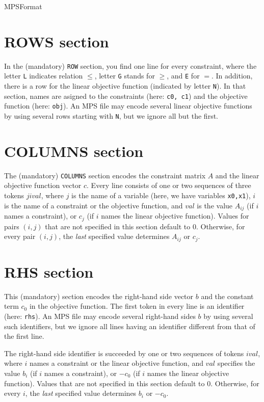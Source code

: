 \begin{ccRefConcept}{MPSFormat}
\section*{ROWS section}
In the (mandatory) \texttt{ROW} section, you find one line for every
constraint, where the letter \texttt{L} indicates relation $\leq$,
letter \texttt{G} stands for $\geq$, and \texttt{E} for $=$. In
addition, there is a row for the linear objective function (indicated
by letter \texttt{N}). In that section, names are asigned to the
constraints (here: \texttt{c0, c1}) and the objective function (here:
\texttt{obj}).  An MPS file may encode several linear objective
functions by using several rows starting with \texttt{N}, but we ignore
all but the first.

\section*{COLUMNS section}
The (mandatory) \texttt{COLUMNS} section encodes the constraint matrix
$A$ and the linear objective function vector $c$. Every line consists
of one or two sequences of three tokens $j i val$, where $j$ is the
name of a variable (here, we have variables \texttt{x0,x1}), $i$ is
the name of a constraint or the objective function, and $val$ is the
value $A_{ij}$ (if $i$ names a constraint), or $c_j$ (if $i$ names the
linear objective function). Values for pairs $(i,j)$ that are not 
specified in this section default to $0$. Otherwise, for every pair 
$(i,j)$, the \emph{last} specified value determines $A_{ij}$ or $c_j$.

\section*{RHS section}
This (mandatory) section encodes the right-hand side vector $b$ and
the constant term $c_0$ in the objective function. The first token in
every line is an identifier (here: \texttt{rhs}). An MPS file may
encode several right-hand sides $b$ by using several such identifiers,
but we ignore all lines having an identifier different from that of
the first line.

The right-hand side identifier is succeeded by one or two sequences
of tokens $i val$, where $i$ names a constraint or the linear 
objective function, and $val$ specifies the value $b_i$ (if
$i$ names a constraint), or $-c_0$ (if $i$ names the linear objective
function). Values that are not specified in this section default to $0$.
Otherwise, for every $i$, the \emph{last} specified value determines 
$b_{i}$ or $-c_0$.


\end{ccRefConcept}
